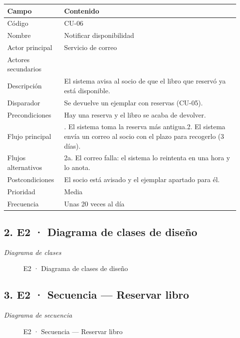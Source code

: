 {\small
\begin{longtable}{@{}>{\raggedright\arraybackslash}p{0.232\linewidth}>{\raggedright\arraybackslash}p{0.717\linewidth}@{}}
\toprule
\textbf{Campo} & \textbf{Contenido} \\
\midrule
\endhead
Código & CU-06 \\
Nombre & Notificar disponibilidad \\
Actor principal & Servicio de correo \\
Actores secundarios &  \\
Descripción & El sistema avisa al socio de que el libro que reservó ya está disponible. \\
Disparador & Se devuelve un ejemplar con reservas (CU-05). \\
Precondiciones & Hay una reserva y el libro se acaba de devolver. \\
Flujo principal & 1. El sistema toma la reserva más antigua.\newline{}2. El sistema envía un correo al socio con el plazo para recogerlo (3 días). \\
Flujos alternativos & 2a. El correo falla: el sistema lo reintenta en una hora y lo anota. \\
Postcondiciones & El socio está avisado y el ejemplar apartado para él. \\
Prioridad & Media \\
Frecuencia & Unas 20 veces al día \\
\bottomrule
\end{longtable}}

\subsection*{2. E2 · Diagrama de clases de diseño}

\emph{Diagrama de clases}

\begin{figure}[H]
\centering
{}
\caption{E2 · Diagrama de clases de diseño}
\end{figure}

\subsection*{3. E2 · Secuencia — Reservar libro}

\emph{Diagrama de secuencia}

\begin{figure}[H]
\centering
{}
\caption{E2 · Secuencia — Reservar libro}
\end{figure}

